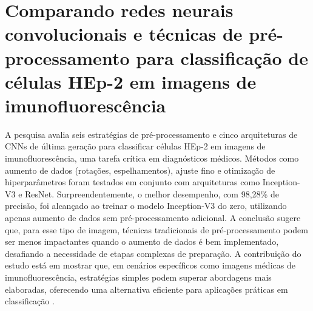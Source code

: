 
\section{Comparando redes neurais convolucionais e técnicas de pré-processamento para classificação de células HEp-2 em imagens de imunofluorescência}
A pesquisa avalia seis estratégias de pré-processamento e cinco arquiteturas de CNNs de última geração para classificar células HEp-2 em imagens de imunofluorescência, uma tarefa crítica em diagnósticos médicos. Métodos como aumento de dados (rotações, espelhamentos), ajuste fino e otimização de hiperparâmetros foram testados em conjunto com arquiteturas como Inception-V3 e ResNet. Surpreendentemente, o melhor desempenho, com 98,28\% de precisão, foi alcançado ao treinar o modelo Inception-V3 do zero, utilizando apenas aumento de dados sem pré-processamento adicional. A conclusão sugere que, para esse tipo de imagem, técnicas tradicionais de pré-processamento podem ser menos impactantes quando o aumento de dados é bem implementado, desafiando a necessidade de etapas complexas de preparação. A contribuição do estudo está em mostrar que, em cenários específicos como imagens médicas de imunofluorescência, estratégias simples podem superar abordagens mais elaboradas, oferecendo uma alternativa eficiente para aplicações práticas em classificação \cite{rodrigues2020comparing}.

